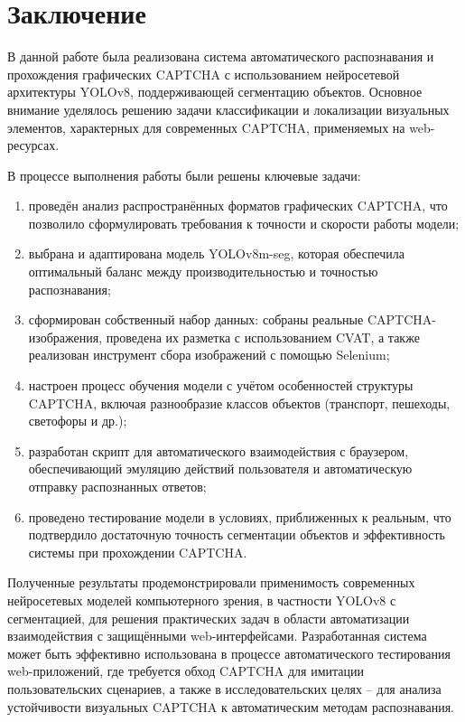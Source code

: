 \documentclass{altsu-report}
\begin{document}




\chapter*{Заключение}

В данной работе была реализована система автоматического распознавания и прохождения графических CAPTCHA с использованием нейросетевой архитектуры YOLOv8, поддерживающей сегментацию объектов. Основное внимание уделялось решению задачи классификации и локализации визуальных элементов, характерных для современных CAPTCHA, применяемых на web-ресурсах.

В процессе выполнения работы были решены ключевые задачи:
\begin{enumerate}
    \item проведён анализ распространённых форматов графических CAPTCHA, что позволило сформулировать требования к точности и скорости работы модели;
    \item выбрана и адаптирована модель YOLOv8m-seg, которая обеспечила оптимальный баланс между производительностью и точностью распознавания;
    \item сформирован собственный набор данных: собраны реальные CAPTCHA-изображения, проведена их разметка с использованием CVAT, а также реализован инструмент сбора изображений с помощью Selenium;
    \item настроен процесс обучения модели с учётом особенностей структуры CAPTCHA, включая разнообразие классов объектов (транспорт, пешеходы, светофоры и др.);
    \item разработан скрипт для автоматического взаимодействия с браузером, обеспечивающий эмуляцию действий пользователя и автоматическую отправку распознанных ответов;
    \item проведено тестирование модели в условиях, приближенных к реальным, что подтвердило достаточную точность сегментации объектов и эффективность системы при прохождении CAPTCHA.
\end{enumerate}

Полученные результаты продемонстрировали применимость современных нейросетевых моделей компьютерного зрения, в частности YOLOv8 с сегментацией, для решения практических задач в области автоматизации взаимодействия с защищёнными web-интерфейсами. Разработанная система может быть эффективно использована в процессе автоматического тестирования web-приложений, где требуется обход CAPTCHA для имитации пользовательских сценариев, а также в исследовательских целях -- для анализа устойчивости визуальных CAPTCHA к автоматическим методам распознавания.
\end{document}
